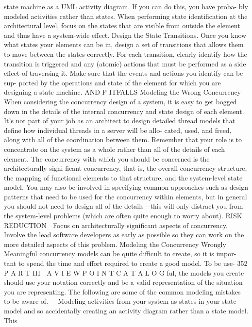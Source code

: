 state machine as a UML activity diagram. If you can do this, you have proba-
bly modeled activities rather than states. When performing state identification
at the architectural level, focus on the states that are visible from outside the
element and thus have a system-wide effect.
Design the State Transitions. Once you know what states your elements
can be in, design a set of transitions that allows them to move between the
states correctly. For each transition, clearly identify how the transition is
triggered and any (atomic) actions that must be performed as a side effect of
traversing it. Make sure that the events and actions you identify can be sup-
ported by the operations and state of the element for which you are
designing a state machine.
AND P ITFALLS
Modeling the Wrong Concurrency
When considering the concurrency design of a system, it is easy to get
bogged down in the details of the internal concurrency and state design of
each element. It’s not part of your job as an architect to design detailed
thread models that define how individual threads in a server will be allo-
cated, used, and freed, along with all of the coordination between them.
Remember that your role is to concentrate on the system as a whole rather
than all of the details of each element. The concurrency with which you
should be concerned is the architecturally signi ficant concurrency, that is,
the overall concurrency structure, the mapping of functional elements to that
structure, and the system-level state model. You may also be involved in
specifying common approaches such as design patterns that need to be used
for the concurrency within elements, but in general you should not need to
design all of the details—this will only distract you from the system-level
problems (which are often quite enough to worry about).
RISK REDUCTION
 Focus on architecturally significant aspects of concurrency.
 Involve the lead software developers as early as possible so they can
work on the more detailed aspects of this problem.
Modeling the Concurrency Wrongly
Meaningful concurrency models can be quite difficult to create, so it is impor-
tant to spend the time and effort required to create a good model. To be use-
352
 P A R T III  A V I E W P O I N T C A T A L O G
ful, the models you create should use your notation correctly and be a valid
representation of the situation you are representing. The following are some
of the common modeling mistakes to be aware of.
Modeling activities from your system as states in your state model and so
accidentally creating an activity diagram rather than a state model. This

